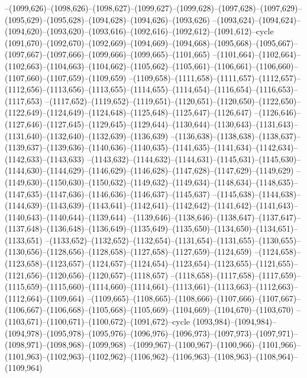 --(1099,626)--(1098,626)--(1098,627)--(1099,627)--(1099,628)--(1097,628)--(1097,629)--(1095,629)--(1095,628)--(1094,628)--(1094,626)--(1093,626)
--(1093,624)--(1094,624)--(1094,620)--(1093,620)--(1093,616)--(1092,616)--(1092,612)--(1091,612)--cycle
(1091,670)--(1092,670)--(1092,669)--(1094,669)--(1094,668)--(1095,668)--(1095,667)--(1097,667)--(1097,666)--(1099,666)--(1099,665)--(1101,665)
--(1101,664)--(1102,664)--(1102,663)--(1104,663)--(1104,662)--(1105,662)--(1105,661)--(1106,661)--(1106,660)--(1107,660)--(1107,659)--(1109,659)
--(1109,658)--(1111,658)--(1111,657)--(1112,657)--(1112,656)--(1113,656)--(1113,655)--(1114,655)--(1114,654)--(1116,654)--(1116,653)--(1117,653)
--(1117,652)--(1119,652)--(1119,651)--(1120,651)--(1120,650)--(1122,650)--(1122,649)--(1124,649)--(1124,648)--(1125,648)--(1125,647)--(1126,647)
--(1126,646)--(1127,646)--(1127,645)--(1129,645)--(1129,644)--(1130,644)--(1130,643)--(1131,643)--(1131,640)--(1132,640)--(1132,639)--(1136,639)
--(1136,638)--(1138,638)--(1138,637)--(1139,637)--(1139,636)--(1140,636)--(1140,635)--(1141,635)--(1141,634)--(1142,634)--(1142,633)--(1143,633)
--(1143,632)--(1144,632)--(1144,631)--(1145,631)--(1145,630)--(1144,630)--(1144,629)--(1146,629)--(1146,628)--(1147,628)--(1147,629)--(1149,629)
--(1149,630)--(1150,630)--(1150,632)--(1149,632)--(1149,634)--(1148,634)--(1148,635)--(1147,635)--(1147,636)--(1146,636)--(1146,637)--(1145,637)
--(1145,638)--(1144,638)--(1144,639)--(1143,639)--(1143,641)--(1142,641)--(1142,642)--(1141,642)--(1141,643)--(1140,643)--(1140,644)--(1139,644)
--(1139,646)--(1138,646)--(1138,647)--(1137,647)--(1137,648)--(1136,648)--(1136,649)--(1135,649)--(1135,650)--(1134,650)--(1134,651)--(1133,651)
--(1133,652)--(1132,652)--(1132,654)--(1131,654)--(1131,655)--(1130,655)--(1130,656)--(1128,656)--(1128,658)--(1127,658)--(1127,659)--(1124,659)
--(1124,658)--(1123,658)--(1123,657)--(1124,657)--(1124,654)--(1123,654)--(1123,655)--(1121,655)--(1121,656)--(1120,656)--(1120,657)--(1118,657)
--(1118,658)--(1117,658)--(1117,659)--(1115,659)--(1115,660)--(1114,660)--(1114,661)--(1113,661)--(1113,663)--(1112,663)--(1112,664)--(1109,664)
--(1109,665)--(1108,665)--(1108,666)--(1107,666)--(1107,667)--(1106,667)--(1106,668)--(1105,668)--(1105,669)--(1104,669)--(1104,670)--(1103,670)
--(1103,671)--(1100,671)--(1100,672)--(1091,672)--cycle
(1093,984)--(1094,984)--(1094,978)--(1095,978)--(1095,976)--(1096,976)--(1096,973)--(1097,973)--(1097,971)--(1098,971)--(1098,968)--(1099,968)
--(1099,967)--(1100,967)--(1100,966)--(1101,966)--(1101,963)--(1102,963)--(1102,962)--(1106,962)--(1106,963)--(1108,963)--(1108,964)--(1109,964)
